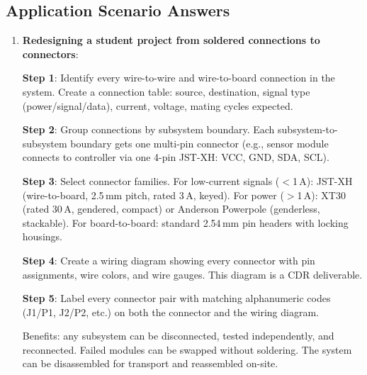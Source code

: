 \subsection{Application Scenario Answers}
\begin{enumerate}[leftmargin=1.5em, start=11]
\item \textbf{Redesigning a student project from soldered connections to connectors}:

\textbf{Step 1}: Identify every wire-to-wire and wire-to-board connection in the system. Create a connection table: source, destination, signal type (power/signal/data), current, voltage, mating cycles expected.

\textbf{Step 2}: Group connections by subsystem boundary. Each subsystem-to-subsystem boundary gets one multi-pin connector (e.g., sensor module connects to controller via one 4-pin JST-XH: VCC, GND, SDA, SCL).

\textbf{Step 3}: Select connector families. For low-current signals ($<$1\,A): JST-XH (wire-to-board, 2.5\,mm pitch, rated 3\,A, keyed). For power ($>$1\,A): XT30 (rated 30\,A, gendered, compact) or Anderson Powerpole (genderless, stackable). For board-to-board: standard 2.54\,mm pin headers with locking housings.

\textbf{Step 4}: Create a wiring diagram showing every connector with pin assignments, wire colors, and wire gauges. This diagram is a CDR deliverable.

\textbf{Step 5}: Label every connector pair with matching alphanumeric codes (J1/P1, J2/P2, etc.) on both the connector and the wiring diagram.

Benefits: any subsystem can be disconnected, tested independently, and reconnected. Failed modules can be swapped without soldering. The system can be disassembled for transport and reassembled on-site.
\end{enumerate}

